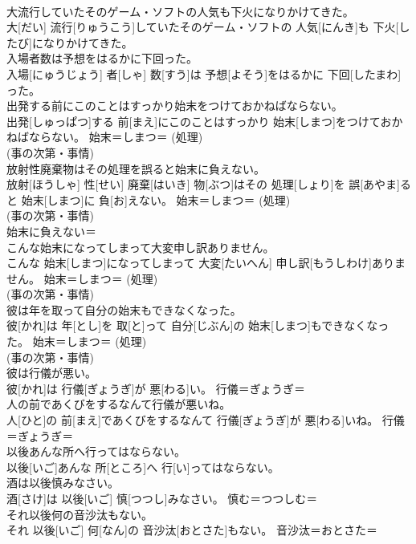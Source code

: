 \documentclass[8pt]{extreport}
\begin{document}
\begin{CJK}{UTF8}{min}
{\\	大流行していたそのゲーム・ソフトの人気も下火になりかけてきた。	
\\	大[だい] 流行[りゅうこう]していたそのゲーム・ソフトの 人気[にんき]も 下火[したび]になりかけてきた。	
\\	入場者数は予想をはるかに下回った。	
\\	入場[にゅうじょう] 者[しゃ] 数[すう]は 予想[よそう]をはるかに 下回[したまわ]った。	
\\	出発する前にこのことはすっかり始末をつけておかねばならない。	
\\	出発[しゅっぱつ]する 前[まえ]にこのことはすっかり 始末[しまつ]をつけておかねばならない。	始末＝しまつ＝ (処理) 
\\	(事の次第・事情) 
\\	放射性廃棄物はその処理を誤ると始末に負えない。	
\\	放射[ほうしゃ] 性[せい] 廃棄[はいき] 物[ぶつ]はその 処理[しょり]を 誤[あやま]ると 始末[しまつ]に 負[お]えない。	始末＝しまつ＝ (処理) 
\\	(事の次第・事情) 
\\	始末に負えない＝ 
\\	こんな始末になってしまって大変申し訳ありません。	
\\	こんな 始末[しまつ]になってしまって 大変[たいへん] 申し訳[もうしわけ]ありません。	始末＝しまつ＝ (処理) 
\\	(事の次第・事情) 
\\	彼は年を取って自分の始末もできなくなった。	
\\	彼[かれ]は 年[とし]を 取[と]って 自分[じぶん]の 始末[しまつ]もできなくなった。	始末＝しまつ＝ (処理) 
\\	(事の次第・事情) 
\\	彼は行儀が悪い。	
\\	彼[かれ]は 行儀[ぎょうぎ]が 悪[わる]い。	行儀＝ぎょうぎ＝ 
\\	人の前であくびをするなんて行儀が悪いね。	
\\	人[ひと]の 前[まえ]であくびをするなんて 行儀[ぎょうぎ]が 悪[わる]いね。	行儀＝ぎょうぎ＝ 
\\	以後あんな所へ行ってはならない。	
\\	以後[いご]あんな 所[ところ]へ 行[い]ってはならない。	
\\	酒は以後慎みなさい。	
\\	酒[さけ]は 以後[いご] 慎[つつし]みなさい。	慎む＝つつしむ＝ 
\\	それ以後何の音沙汰もない。	
\\	それ 以後[いご] 何[なん]の 音沙汰[おとさた]もない。	音沙汰＝おとさた＝ 
}
\end{CJK}
\end{document}
